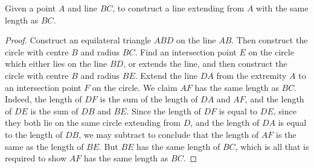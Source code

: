 \begin{theorem}
    Given a point $A$ and line $BC$, to construct a line extending from $A$ with the same length as $BC$.
\end{theorem}
\begin{proof}
    Construct an equilateral triangle $ABD$ on the line $AB$. Then construct the circle with centre $B$ and radius $BC$. Find an intersection point $E$ on the circle which either lies on the line $BD$, or extends the line, and then construct the circle with centre $B$ and radius $BE$. Extend the line $DA$ from the extremity $A$ to an intersection point $F$ on the circle. We claim $AF$ has the same length as $BC$. Indeed, the length of $DF$ is the sum of the length of $DA$ and $AF$, and the length of $DE$ is the sum of $DB$ and $BE$. Since the length of $DF$ is equal to $DE$, since they both lie on the same circle extending from $D$, and the length of $DA$ is equal to the length of $DB$, we may subtract to conclude that the length of $AF$ is the same as the length of $BE$. But $BE$ has the same length of $BC$, which is all that is required to show $AF$ has the same length as $BC$.
\end{proof}


